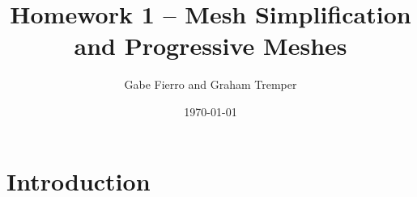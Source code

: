 \documentclass[11pt]{article}
\begin{document}
\title{Homework 1 -- Mesh Simplification and Progressive Meshes}
\author{Gabe Fierro and Graham Tremper}
\date{\today}
\maketitle

\section{Introduction}
\end{document}

